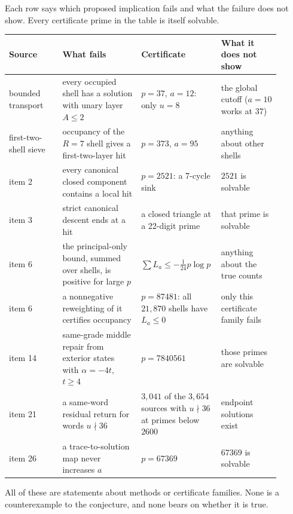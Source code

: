 Each row says which proposed implication fails and what the failure does not show. Every certificate prime in the table is itself solvable.

\begin{center}\small
\begin{longtable}{@{}>{\raggedright\arraybackslash}p{0.19\linewidth}>{\raggedright\arraybackslash}p{0.29\linewidth}>{\raggedright\arraybackslash}p{0.21\linewidth}>{\raggedright\arraybackslash}p{0.21\linewidth}@{}}
\toprule
Source & What fails & Certificate & What it does not show\\
\midrule
\endhead
bounded transport & every occupied shell has a solution with unary layer $A\le2$ & $p=37$, $a=12$: only $u=8$ & the global cutoff ($a=10$ works at $37$)\\
first-two-shell sieve & occupancy of the $R=7$ shell gives a first-two-layer hit & $p=373$, $a=95$ & anything about other shells\\
item 2 & every canonical closed component contains a local hit & $p=2521$: a 7-cycle sink & $2521$ is solvable\\
item 3 & strict canonical descent ends at a hit & a closed triangle at a 22-digit prime & that prime is solvable\\
item 6 & the principal-only bound, summed over shells, is positive for large $p$ & $\sum L_a\le-\frac1{24}p\log p$ & anything about the true counts\\
item 6 & a nonnegative reweighting of it certifies occupancy & $p=87481$: all $21{,}870$ shells have $L_a\le0$ & only this certificate family fails\\
item 14 & same-grade middle repair from exterior states with $\alpha=-4t$, $t\ge4$ & $p=7840561$ & those primes are solvable\\
item 21 & a same-word residual return for words $u\nmid36$ & $3{,}041$ of the $3{,}654$ sources with $u\nmid36$ at primes below $2600$ & endpoint solutions exist\\
item 26 & a trace-to-solution map never increases $a$ & $p=67369$ & $67369$ is solvable\\
\bottomrule
\end{longtable}
\end{center}
All of these are statements about methods or certificate families. None is a counterexample to the conjecture, and none bears on whether it is true.
